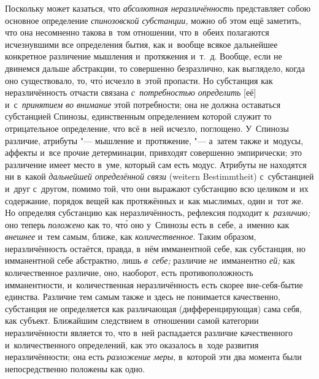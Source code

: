 Поскольку может казаться, что {\em абсолютная неразличённость} представляет
собою основное определение {\em спинозовской субстанции,} можно об этом ещё
заметить, что она несомненно такова в~том отношении, что в~обеих полагаются
исчезнувшими все определения бытия, как и~вообще всякое дальнейшее конкретное
различение мышления и~протяжения и~т.~д. Вообще, если не двинемся дальше
абстракции, то совершенно безразлично, как выглядело, когда оно существовало,
то, чт\'{о} исчезло в~этой пропасти. Но субстанция как неразличённость отчасти
связана {\em с~потребностью определить} [её] и~с~{\em принятием во внимание}
этой потребности; она не должна оставаться субстанцией Спинозы, единственным
определением которой служит то отрицательное определение, что всё в~ней
исчезло, поглощено. У~Спинозы
различие, атрибуты "--- мышление и~протяжение, "--- а~затем также и~модусы,
аффекты и~все прочие детерминации, привходят совершенно эмпирически; это
различение имеет место в~уме, который сам есть модус. Атрибуты не находятся ни
в~какой {\em дальнейшей определённой связи} (wei\-tern Be\-stimmt\-heit)
с~субстанцией и~друг с~другом, помимо той, что они выражают субстанцию всю
целиком и~их содержание, порядок вещей как протяжённых и~как мыслимых, один
и~тот же. Но определяя субстанцию как неразличённость, рефлексия подходит
к~{\em различию;} оно теперь {\em положено} как то, чт\'{о} оно у~Спинозы есть
в~себе, а~именно как {\em внешнее} и~тем самым, ближе, как
{\em количественное}. Таким образом, неразличённость остаётся, правда, в~нём
имманентной себе, как субстанция, но имманентной себе абстрактно, лишь
{\em в~себе;} различие {\em не}~имманентно {\em ей;} как количественное
различие, оно, наоборот, есть противоположность имманентности, и~количественная
неразличённость есть скорее вне-себя-бытие единства. Различие тем самым также и
здесь не понимается качественно, субстанция не определяется как различающая
(дифференцирующая) сама себя, как субъект. Ближайшим следствием в~отношении
самой категории неразличённости является то, что в~ней распадается различие
качественного и~количественного определений, как это оказалось в~ходе развития
неразличённости; она есть {\em разложение меры,} в~которой эти два момента были
непосредственно положены как одно.

